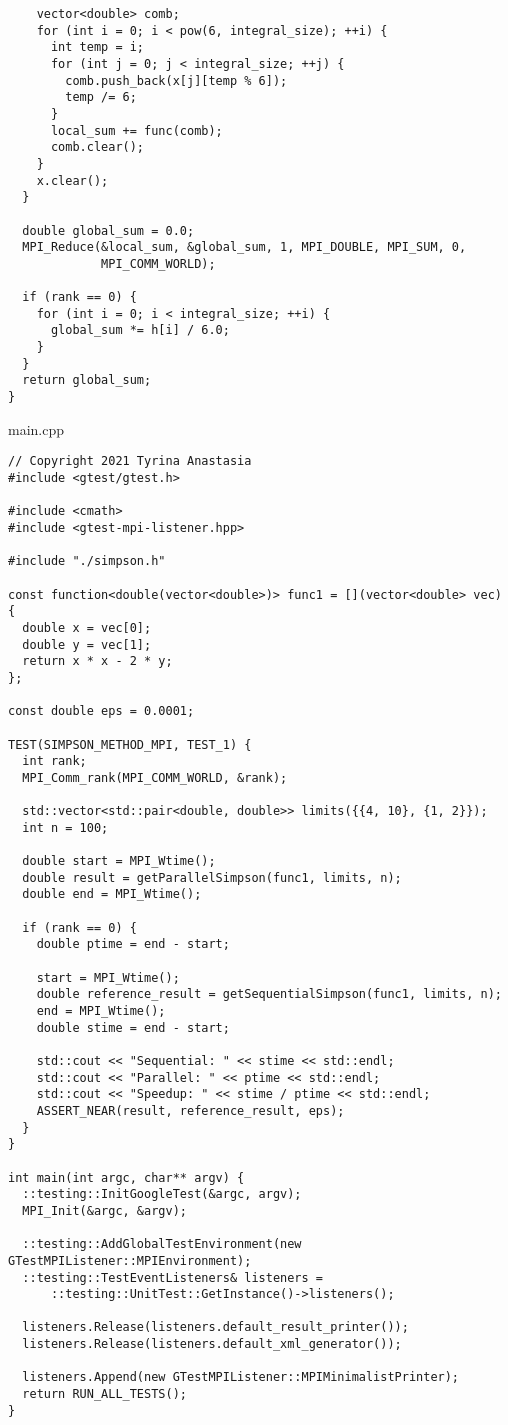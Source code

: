 \documentclass{report}
\begin{document}
\begin{lstlisting}
    vector<double> comb;
    for (int i = 0; i < pow(6, integral_size); ++i) {
      int temp = i;
      for (int j = 0; j < integral_size; ++j) {
        comb.push_back(x[j][temp % 6]);
        temp /= 6;
      }
      local_sum += func(comb);
      comb.clear();
    }
    x.clear();
  }

  double global_sum = 0.0;
  MPI_Reduce(&local_sum, &global_sum, 1, MPI_DOUBLE, MPI_SUM, 0,
             MPI_COMM_WORLD);

  if (rank == 0) {
    for (int i = 0; i < integral_size; ++i) {
      global_sum *= h[i] / 6.0;
    }
  }
  return global_sum;
}

\end{lstlisting}
main.cpp
\begin{lstlisting}
// Copyright 2021 Tyrina Anastasia
#include <gtest/gtest.h>

#include <cmath>
#include <gtest-mpi-listener.hpp>

#include "./simpson.h"

const function<double(vector<double>)> func1 = [](vector<double> vec) {
  double x = vec[0];
  double y = vec[1];
  return x * x - 2 * y;
};

const double eps = 0.0001;

TEST(SIMPSON_METHOD_MPI, TEST_1) {
  int rank;
  MPI_Comm_rank(MPI_COMM_WORLD, &rank);

  std::vector<std::pair<double, double>> limits({{4, 10}, {1, 2}});
  int n = 100;

  double start = MPI_Wtime();
  double result = getParallelSimpson(func1, limits, n);
  double end = MPI_Wtime();

  if (rank == 0) {
    double ptime = end - start;

    start = MPI_Wtime();
    double reference_result = getSequentialSimpson(func1, limits, n);
    end = MPI_Wtime();
    double stime = end - start;

    std::cout << "Sequential: " << stime << std::endl;
    std::cout << "Parallel: " << ptime << std::endl;
    std::cout << "Speedup: " << stime / ptime << std::endl;
    ASSERT_NEAR(result, reference_result, eps);
  }
}

int main(int argc, char** argv) {
  ::testing::InitGoogleTest(&argc, argv);
  MPI_Init(&argc, &argv);

  ::testing::AddGlobalTestEnvironment(new GTestMPIListener::MPIEnvironment);
  ::testing::TestEventListeners& listeners =
      ::testing::UnitTest::GetInstance()->listeners();

  listeners.Release(listeners.default_result_printer());
  listeners.Release(listeners.default_xml_generator());

  listeners.Append(new GTestMPIListener::MPIMinimalistPrinter);
  return RUN_ALL_TESTS();
}

\end{lstlisting}
\end{document}
